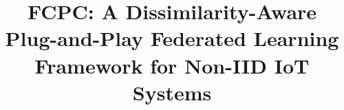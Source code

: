 \documentclass[journal,twoside,web]{ieeecolor}
\begin{document}
\title{FCPC: A Dissimilarity-Aware Plug-and-Play Federated Learning Framework for Non-IID IoT Systems}



\maketitle
\end{document}
